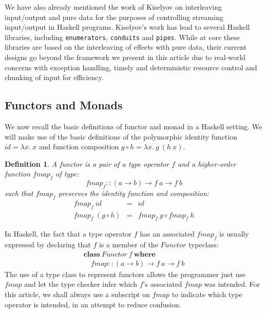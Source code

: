\documentclass{jfp1}
\newtheorem{definition}{Definition}
\newcommand{\kw}[1]{\textbf{#1}}
\begin{document}
We have also already mentioned the work of Kiselyov
\cite{kiselyov12iteratees} on interleaving input/output and pure data
for the purposes of controlling streaming input/output in Haskell
programs. Kiselyov's work has lead to several Haskell libraries,
including \texttt{enumerators}, \texttt{conduits} and
\texttt{pipes}. While at core these libraries are based on the
interleaving of effects with pure data, their current designs go
beyond the framework we present in this article due to real-world
concerns with exception handling, timely and deterministic resource
control and chunking of input for efficiency.

\subsection{Functors and Monads}

We now recall the basic definitions of functor and monad in a Haskell
setting. We will make use of the basic definitions of the polymorphic
identity function $\mathit{id} = \lambda x.~x$ and function
composition $g \circ h = \lambda x.~g~(h~x)$.

\begin{definition}\label{defn:functor}
  A functor is a pair of a type operator $f$ and a higher-order
  function $\mathit{fmap}_f$ of type:
  \begin{displaymath}
    \mathit{fmap}_f :: (a \to b) \to f~a \to f~b
  \end{displaymath}
  such that $\mathit{fmap}_f$ preserves the identity function and
  composition:
  \begin{displaymath}
    \begin{array}{rcl}
      \mathit{fmap}_f~\mathit{id} & = & \mathit{id} \\
      \mathit{fmap}_f~(g \circ h) & = & \mathit{fmap}_f~g \circ \mathit{fmap}_f~h
    \end{array}
  \end{displaymath}
\end{definition}

In Haskell, the fact that a type operator $f$ has an associated
$\mathit{fmap}_f$ is usually expressed by declaring that $f$ is a
member of the $\mathit{Functor}$ typeclass:
\begin{displaymath}
  \begin{array}{l}
    \kw{class}~\mathit{Functor}~f~\kw{where} \\
    \quad \mathit{fmap} :: (a \to b) \to f~a \to f~b
  \end{array}
\end{displaymath}
The use of a type class to represent functors allows the programmer
just use $\mathit{fmap}$ and let the type checker infer which $f$'s
associated $\mathit{fmap}$ was intended. For this article, we shall
always use a subscript on $\mathit{fmap}$ to indicate which type
operator is intended, in an attempt to reduce confusion.
\end{document}

